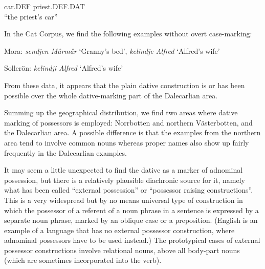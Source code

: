 car.DEF  priest.DEF.DAT\\

\glt “the priest’s car”

\z

In the Cat Corpus, we find the following examples without overt case-marking:


\item 


Mora: \textit{sendjen Mårmår} ‘Granny’s bed’, \textit{kelindje Alfred }‘Alfred’s wife’


Sollerön: \textit{kelindji Alfred} ‘Alfred’s wife’


From these data, it appears that the plain dative construction is or has been possible over the whole dative-marking part of the Dalecarlian area. 


Summing up the geographical distribution, we find two areas where dative marking of possessors is employed: Norrbotten and northern Västerbotten, and the Dalecarlian area. A possible difference is that the examples from the northern area tend to involve common nouns whereas proper names also show up fairly frequently in the Dalecarlian examples. 


It may seem a little unexpected to find the dative as a marker of adnominal possession, but there is a relatively plausible diachronic source for it, namely what has been called “external possession” or “possessor raising constructions”. This is a very widespread but by no means universal type of construction in which the possessor of a referent of a noun phrase in a sentence is expressed by a separate noun phrase, marked by an oblique case or a preposition. (English is an example of a language that has no external possessor construction, where adnominal possessors have to be used instead.) The prototypical cases of external possessor constructions involve relational nouns, above all body-part nouns (which are sometimes incorporated into the verb).

